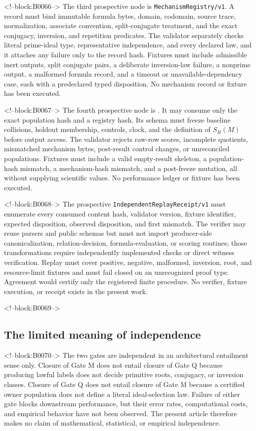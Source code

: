 \documentclass[11pt,a4paper]{article}
\begin{document}
<!--block:B0066-->
The third prospective node is \texttt{MechanismRegistry/v1}. A record must bind immutable formula bytes, domain, codomain, source trace, normalization, associate convention, split-conjugate treatment, and the exact conjugacy, inversion, and repetition predicates. The validator separately checks literal prime-ideal type, representative independence, and every declared law, and it attaches any failure only to the record hash. Fixtures must include admissible inert outputs, split conjugate pairs, a deliberate inversion-law failure, a nonprime output, a malformed formula record, and a timeout or unavailable-dependency case, each with a predeclared typed disposition. No mechanism record or fixture has been executed.

<!--block:B0067-->
The fourth prospective node is . It may consume only the exact  population hash and a  registry hash. Its schema must freeze baseline collisions, holdout membership, controls, clock, and the definition of \(S_H(M)\) before output access. The validator rejects raw-row scores, incomplete quotients, mismatched mechanism bytes, post-result control changes, or unreconciled populations. Fixtures must include a valid empty-result skeleton, a population-hash mismatch, a mechanism-hash mismatch, and a post-freeze mutation, all without supplying scientific values. No performance ledger or fixture has been executed.

<!--block:B0068-->
The prospective \texttt{IndependentReplayReceipt/v1} must enumerate every consumed content hash, validator version, fixture identifier, expected disposition, observed disposition, and first mismatch. The verifier may reuse parsers and public schemas but must not import producer-side canonicalization, relation-decision, formula-evaluation, or scoring routines; those transformations require independently implemented checks or direct witness verification. Replay must cover positive, negative, malformed, inversion, root, and resource-limit fixtures and must fail closed on an unrecognized proof type. Agreement would certify only the registered finite procedure. No verifier, fixture execution, or receipt exists in the present work.

<!--block:B0069-->
\subsection{The limited meaning of independence}

<!--block:B0070-->
The two gates are independent in an architectural entailment sense only. Closure of Gate M does not entail closure of Gate Q because producing lawful labels does not decide primitive roots, conjugacy, or inversion classes. Closure of Gate Q does not entail closure of Gate M because a certified owner population does not define a literal ideal-selection law. Failure of either gate blocks downstream performance, but their error rates, computational costs, and empirical behavior have not been observed. The present article therefore makes no claim of mathematical, statistical, or empirical independence.
\end{document}
